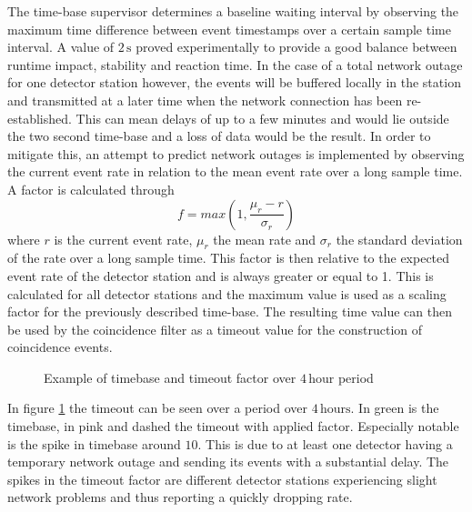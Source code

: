 \documentclass[abstract,toc,los,lof,english,10pt,glossary,acronyms]{jluthesis}
\begin{document}
The time-base supervisor determines a baseline waiting interval by observing the maximum time difference between event timestamps over a certain sample time interval. A value of $2\,\text{s}$ proved experimentally to provide a good balance between runtime impact, stability and reaction time. In the case of a total network outage for one detector station however, the events will be buffered locally in the station and transmitted at a later time when the network connection has been re-established. This can mean delays of up to a few minutes and would lie outside the two second time-base and a loss of data would be the result. In order to mitigate this, an attempt to predict network outages is implemented by observing the current event rate in relation to the mean event rate over a long sample time. A factor is calculated through
\begin{equation*}
	f = max(1, \frac{\mu_{r} - r}{\sigma_{r}})
\end{equation*}
where $r$ is the current event rate, $\mu_{r}$ the mean rate and $\sigma_{r}$ the standard deviation of the rate over a long sample time. This factor is then relative to the expected event rate of the detector station and is always greater or equal to 1. This is calculated for all detector stations and the maximum value is used as a scaling factor for the previously described time-base.
\clearpage
The resulting time value can then be used by the coincidence filter as a timeout value for the construction of coincidence events.

\begin{figure}[ht!]
	\centering
	
	\caption{Example of timebase and timeout factor over $4\,\text{hour}$ period}
	\label{fig:timeout-example}
\end{figure}
In figure \ref{fig:timeout-example} the timeout can be seen over a period over $4\,\text{hours}$. In green is the timebase, in pink and dashed the timeout with applied factor. Especially notable is the spike in timebase around $10$. This is due to at least one detector having a temporary network outage and sending its events with a substantial delay. The spikes in the timeout factor are different detector stations experiencing slight network problems and thus reporting a quickly dropping rate.
\clearpage
\end{document}
